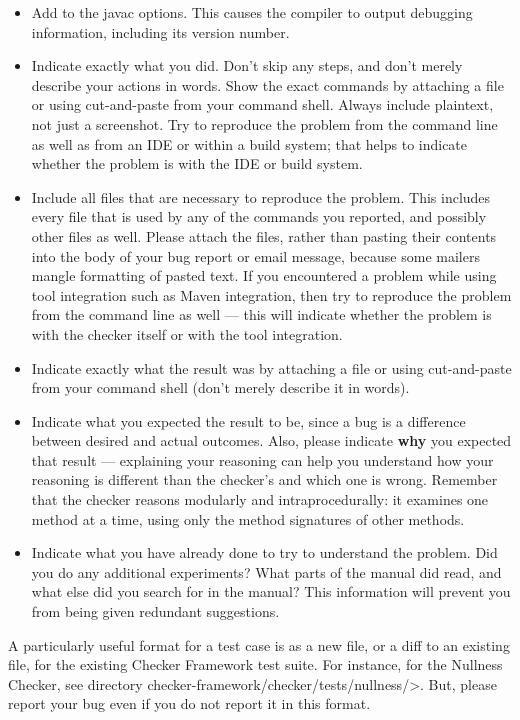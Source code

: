 \begin{itemize}
\item
  Add 
  to the javac options.  This causes the compiler to output
  debugging information, including its version number.
\item
  Indicate exactly what you did.  Don't skip any steps, and don't merely
  describe your actions in words.  Show the exact commands by attaching a
  file or using cut-and-paste from your command shell.  Always include
  plaintext, not just a screenshot.  Try to reproduce the problem from the
  command line as well as from an IDE or within a build system; that helps
  to indicate whether the problem is with the IDE or build system.
\item
  Include all files that are necessary to reproduce the problem.  This
  includes every file that is used by any of the commands you reported, and
  possibly other files as well.  Please attach the files, rather than
  pasting their contents into the body of your bug report or email message,
  because some mailers mangle formatting of pasted text.  If you
  encountered a problem while using tool integration such as
  Maven integration, then try to reproduce the problem from the
  command line as well --- this will indicate whether the problem is with
  the checker itself or with the tool integration.
\item
  Indicate exactly what the result was by attaching a file or using
  cut-and-paste from your command shell (don't merely describe it in
  words).
\item
  Indicate what you expected the result to be, since a bug is a difference
  between desired and actual outcomes.  Also, please indicate \textbf{why}
  you expected that result --- explaining your reasoning can help you
  understand how your reasoning is different than the checker's and which
  one is wrong.  Remember that the checker reasons modularly and
  intraprocedurally:  it examines one method at a time, using only the
  method signatures of other methods.
\item
  Indicate what you have already done to try to understand the problem.
  Did you do any additional experiments?  What parts of the manual did
  read, and what else did you search for in the manual?  This information
  will prevent you from being given redundant suggestions.
\end{itemize}

A particularly useful format for a test case is as a new file, or a diff to
an existing file, for the existing Checker Framework test suite.  For
instance, for the Nullness
Checker, see directory \<checker-framework/checker/tests/nullness/>.
But, please report your bug even if you do not report it in this format.

